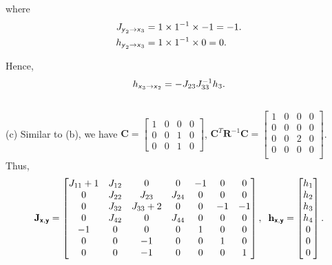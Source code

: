 \documentclass{article}
\newcommand{\s}[1]{\textsf{\textit{#1}}}
\newcommand{\bs}[1]{\textsf{\textbf{#1}}}
\newcommand{\bm}{\mathbf}
\begin{document}
where
\begin{align*}
	J_{\s{y}_2\to\s{x}_3} &= 1\times1^{-1}\times -1 = -1.\\
	h_{\s{y}_2\to\s{x}_3} &= 1\times1^{-1}\times 0 = 0.\\
\end{align*}

Hence,
\begin{align*}
	h_{\s{x}_3\to\s{x}_2} &= -J_{23}J_{33}^{-1}h_{3}.\\
\end{align*}
\\

\noindent
(c) Similar to (b), we have $\bm{C} =
\begin{bmatrix}
    1 & 0 & 0 & 0 \\
    0 & 0 & 1 & 0 \\
    0 & 0 & 1 & 0
\end{bmatrix}$, $\bm{C}^T\bm{R}^{-1}\bm{C} = 
\begin{bmatrix}
    1 & 0 & 0 & 0 \\
    0 & 0 & 0 & 0 \\
    0 & 0 & 2 & 0 \\
    0 & 0 & 0 & 0 \\
\end{bmatrix}$. Thus,
\begin{align*}
\bm{J}_{\bs{x}, \bs{y}} =
\begin{bmatrix}
    J_{11} + 1 & J_{12} & 0 & 0 & -1 & 0 & 0\\
    0 & J_{22} & J_{23} & J_{24} & 0 & 0 & 0\\
    0 & J_{32} & J_{33} + 2 & 0 & 0 & -1 & -1\\
    0 & J_{42} & 0 & J_{44} & 0 & 0 & 0\\
    -1 & 0 & 0 & 0 & 1 & 0 & 0\\
    0 & 0 & -1 & 0 & 0 & 1 & 0\\
    0 & 0 & -1 & 0 & 0 & 0 & 1\\
\end{bmatrix}, \;\;
\bm{h}_{\bs{x}, \bs{y}} = 
\begin{bmatrix}
    h_1 \\
    h_2 \\
    h_3 \\
    h_4 \\
    0 \\
    0\\
    0\\
\end{bmatrix}.
\end{align*}
\end{document}
